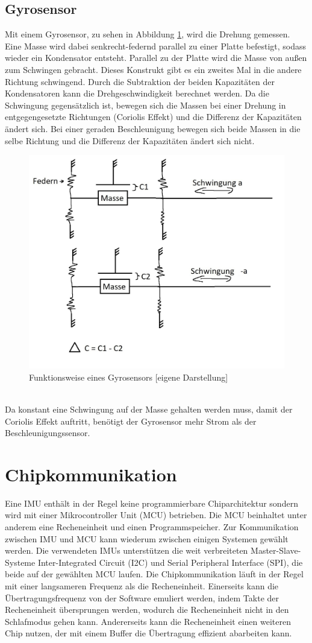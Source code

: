 \subsection{Gyrosensor}
Mit einem Gyrosensor, zu sehen in Abbildung \ref{fig:pic_gyro}, wird die Drehung gemessen.
Eine Masse wird dabei senkrecht-federnd parallel zu einer Platte befestigt, sodass wieder ein Kondensator entsteht.
Parallel zu der Platte wird die Masse von außen zum Schwingen gebracht.
Dieses Konstrukt gibt es ein zweites Mal in die andere Richtung schwingend.
Durch die Subtraktion der beiden Kapazitäten der Kondensatoren kann die Drehgeschwindigkeit berechnet werden.
Da die Schwingung gegensätzlich ist, bewegen sich die Massen bei einer Drehung in entgegengesetzte Richtungen (Coriolis Effekt) und die Differenz der Kapazitäten ändert sich.
Bei einer geraden Beschleunigung bewegen sich beide Massen in die selbe Richtung und die Differenz der Kapazitäten ändert sich nicht. \cite{gyrosensor}
\begin{figure}[hbtp]
	\centering
	\includegraphics[width=0.65\linewidth]{res/gyro.jpg}
	\caption{Funktionsweise eines Gyrosensors [eigene Darstellung]}
	\label{fig:pic_gyro}
\end{figure}\\
Da konstant eine Schwingung auf der Masse gehalten werden muss, damit der Coriolis Effekt auftritt, benötigt der Gyrosensor mehr Strom als der Beschleunigungssensor.

\section{Chipkommunikation}
Eine IMU enthält in der Regel keine programmierbare Chiparchitektur sondern wird mit einer Mikrocontroller Unit (MCU) betrieben.
Die MCU beinhaltet unter anderem eine Recheneinheit und einen Programmspeicher.
Zur Kommunikation zwischen IMU und MCU kann wiederum zwischen einigen Systemen gewählt werden.
Die verwendeten IMUs unterstützen die weit verbreiteten Master-Slave-Systeme Inter-Integrated Circuit (I2C) und Serial Peripheral Interface (SPI), die beide auf der gewählten MCU laufen.
Die Chipkommunikation läuft in der Regel mit einer langsameren Frequenz als die Recheneinheit.
Einerseits kann die Übertragungsfrequenz von der Software emuliert werden, indem Takte der Recheneinheit übersprungen werden, wodurch die Recheneinheit nicht in den Schlafmodus gehen kann.
Andererseits kann die Recheneinheit einen weiteren Chip nutzen, der mit einem Buffer die Übertragung effizient abarbeiten kann.

